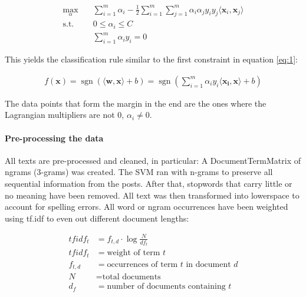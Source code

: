 \begin{equation}
    \begin{array}{cl}
         \max_{\alpha} \quad &\sum _{{i=1}}^{m}\alpha _{i}-{\frac  {1}{2}}\sum _{{i=1}}^{m}\sum _{{j=1}}^{m}\alpha _{i}\alpha _{j}y_{i}y_{j}\langle {\mathbf  x}_{i},{\mathbf  x}_{j}\rangle \\[10pt]
         \text{s.t.} \quad &{\displaystyle 0\leq \alpha _{i}\leq C}\\
         &\sum _{{i=1}}^{m}\alpha _{i}y_{i}=0
    \end{array}
\end{equation}

This yields the classification rule similar to the first constraint in equation \ref{eq:1}:

\begin{equation}
    \begin{array}{c}
        {\displaystyle f(\mathbf {x} )=\operatorname {sgn}(\langle \mathbf {w,x} \rangle +b)=\operatorname {sgn} \left(\sum _{i=1}^{m}\alpha _{i}y_{i}\langle \mathbf {x_{i},x} \rangle +b\right)}
    \end{array}
\end{equation}

The data points that form the margin in the end are the ones where the Lagrangian multipliers are not 0, $\alpha_i \neq 0$.

\paragraph{Pre-processing the data} All texts are pre-processed and cleaned, in particular:
A DocumentTermMatrix of ngrams (3-grams) was created. The SVM ran with n-grams to preserve all sequential information from the posts. After that, stopwords that carry little or no meaning have been removed. All text was then transformed into lowerspace to account for spelling errors. All word or ngram occurrences have been weighted using tf.idf to even out different document lengths:

\begin{equation}
\begin{array}{rl}
    tfidf_t &= f_{t,d} \cdot \log{\frac{N}{df_t}}\\[10pt]
    tfidf_t &= \text{weight of term } t\\
    f_{t,d} &= \text{occurrences of term $t$ in document $d$}\\
    N &= \text{total documents}\\
    d_f &= \text{number of documents containing $t$}
\end{array}
\end{equation}

